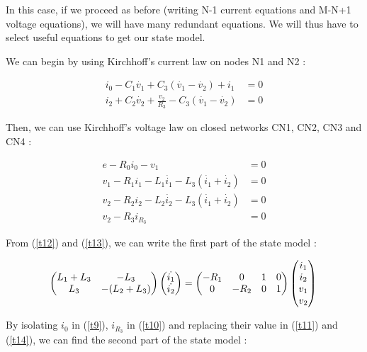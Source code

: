 In this case, if we proceed as before (writing N-1 current equations and M-N+1 voltage equations), we will have many redundant equations. We will thus have to select useful equations to get our state model.\\

\newpage

We can begin by using Kirchhoff's current law on nodes N1 and N2 :

\begin{align}
\label{t9}
i_0 - C_1 \dot{v_1} + C_3 \left( \dot{v_1} - \dot{v_2}\right) + i_1 & = 0\\
\label{t10}
i_2 + C_2 \dot{v_2} + \frac{v_2}{R_3} - C_3 \left( \dot{v_1} - \dot{v_2}\right) & = 0
\end{align}

Then, we can use Kirchhoff's voltage law on closed networks CN1, CN2, CN3 and CN4 :

\begin{align}
\label{t11}
e-R_0i_0-v_1 & = 0\\
\label{t12}
v_1-R_1i_1- L_1 \dot{i_1} - L_3 \left( \dot{i_1} + \dot{i_2} \right) & = 0\\
\label{t13}
v_2-R_2i_2- L_2 \dot{i_2} - L_3 \left( \dot{i_1} + \dot{i_2} \right) & = 0\\
\label{t14}
v_2-R_3i_{R_3} & = 0
\end{align}

From (\ref{t12}) and (\ref{t13}), we can write the first part of the state model :


\begin{equation}
\begin{pmatrix}
L_1+L_3 & -L_3\\
L_3 & -(L_2+L_3)
\end{pmatrix}
\begin{pmatrix}
\dot{i_1}\\
\dot{i_2}
\end{pmatrix}
=
\begin{pmatrix}
-R_1 & 0 & 1 & 0\\
0 & -R_2 & 0 & 1
\end{pmatrix}
\begin{pmatrix}
i_1\\
i_2\\
v_1\\
v_2
\end{pmatrix}\\
\end{equation}

By isolating $i_0$ in (\ref{t9}), $i_{R_3}$ in (\ref{t10}) and replacing their value in (\ref{t11}) and (\ref{t14}), we can find the second part of the state model :


